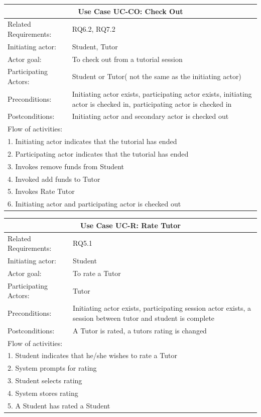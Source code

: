 \documentclass[12pt]{article}
\begin{document}
{		\begin{tabular}{| l | p{10cm}| }
			\hline\multicolumn{2}{|c|}{ \textbf{Use Case UC-CO: Check Out } }\\ \hline
			Related Requirements: &  RQ6.2, RQ7.2\\ \hline
			Initiating actor: & Student, Tutor \\ \hline
			Actor goal: & To check out from a tutorial session\\ \hline
			Participating Actors: & Student or Tutor( not the same as the initiating actor)\\ \hline
			Preconditions: &Initiating actor exists, participating actor exists, initiating actor is checked in, participating actor is checked in\\ \hline
			Postconditions: &Initiating actor and secondary actor is checked out\\ \hline
			\multicolumn{2}{|l|}{Flow of activities:}\\ \hline
			\multicolumn{2}{|p{15cm}|}{1. Initiating actor indicates that the tutorial has ended}\\
			\multicolumn{2}{|p{15cm}|}{2. Participating actor indicates that the tutorial has ended}\\
			\multicolumn{2}{|l|}{3. Invokes remove funds from Student}\\
			\multicolumn{2}{|l|}{4. Invoked add funds to Tutor}\\
			\multicolumn{2}{|l|}{5. Invokes Rate Tutor}\\
			\multicolumn{2}{|l|}{6. Initiating actor and participating actor is checked out}\\
			 \hline
		\end{tabular}


    \begin{tabular}{| l | p{10cm}| }
      \hline\multicolumn{2}{|c|}{ \textbf{Use Case UC-R: Rate Tutor} }\\ \hline
      Related Requirements: &  RQ5.1\\ \hline
      Initiating actor: & Student \\ \hline
      Actor goal: & To rate a Tutor\\ \hline
      Participating Actors: &Tutor\\ \hline
      Preconditions: &Initiating actor exists, participating session actor exists, a session between  tutor and student is complete\\ \hline
      Postconditions: & A Tutor is rated, a tutors rating is changed\\ \hline
      \multicolumn{2}{|l|}{Flow of activities:}\\ \hline
      \multicolumn{2}{|p{15cm}|}{1. Student indicates that he/she wishes to rate a Tutor}\\
      \multicolumn{2}{|p{15cm}|}{2. System prompts for rating}\\
      \multicolumn{2}{|l|}{3. Student selects rating}\\
      \multicolumn{2}{|l|}{4. System stores rating}\\
      \multicolumn{2}{|l|}{5. A Student has rated a Student}\\
       \hline
    \end{tabular}


}
\end{document}
